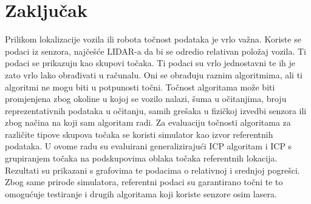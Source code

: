 \chapter{Zaključak}
Prilikom lokalizacije vozila ili robota točnost podataka je vrlo važna. Koriste se podaci iz senzora, najčešće LIDAR-a da bi se odredio relativan položaj vozila. Ti podaci se prikazuju kao skupovi točaka. Ti podaci su vrlo jednostavni te ih je zato vrlo lako obrađivati u računalu. Oni se obrađuju raznim algoritmima, ali ti algoritmi ne mogu biti u potpunosti točni. Točnost algoritama može biti promjenjena zbog okoline u kojoj se vozilo nalazi, šuma u očitanjima, broju reprezentativnih podataka u očitanju, samih grešaka u fizičkoj izvedbi senzora ili zbog načina na koji sam algoritam radi. Za evaluaciju točnosti algoritama za različite tipove skupova točaka se koristi simulator kao izvor referentnih podataka. U ovome radu su evaluirani generalizirajući ICP algoritam i ICP s grupiranjem točaka na podskupovima oblaka točaka referentnih lokacija. Rezultati su prikazani s grafovima te podacima o relativnoj i srednjoj pogrešci. Zbog same prirode simulatora, referentni podaci su garantirano točni te to omogućuje testiranje i drugih algoritama koji koriste senzore osim lasera.